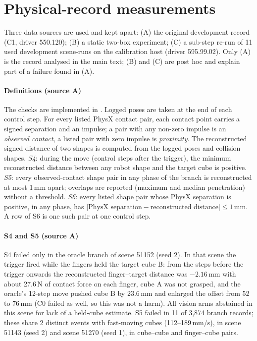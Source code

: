 \section{Physical-record measurements}\label{sec:s-physics}

Three data sources are used and kept apart: (A) the original development record (C1, driver 550.120); (B) a static two-box experiment; (C) a sub-step re-run of 11 used development scene-runs on the calibration host (driver 595.99.02). Only (A) is the record analysed in the main text; (B) and (C) are post hoc and explain part of a failure found in (A).

\paragraph{Definitions (source A)} The checks are implemented in . Logged poses are taken at the end of each control step. For every listed PhysX contact pair, each contact point carries a signed separation and an impulse; a pair with any non-zero impulse is an \emph{observed contact}, a listed pair with zero impulse is \emph{proximity}. The reconstructed signed distance of two shapes is computed from the logged poses and collision shapes. \emph{S4}: during the move (control steps after the trigger), the minimum reconstructed distance between any robot shape and the target cube is positive. \emph{S5}: every observed-contact shape pair in any phase of the branch is reconstructed at most 1\,mm apart; overlaps are reported (maximum and median penetration) without a threshold. \emph{S6}: every listed shape pair whose PhysX separation is positive, in any phase, has $|\text{PhysX separation}-\text{reconstructed distance}|\le1$\,mm. A row of S6 is one such pair at one control step.

\paragraph{S4 and S5 (source A)} S4 failed only in the oracle branch of scene 51152 (seed 2). In that scene the trigger fired while the fingers held the target cube B: from the steps before the trigger onwards the reconstructed finger--target distance was $-2.16$\,mm with about 27.6\,N of contact force on each finger, cube A was not grasped, and the oracle's 12-step move pushed cube B by 23.6\,mm and enlarged the offset from 52 to 76\,mm (C0 failed as well, so this was not a harm). All vision arms abstained in this scene for lack of a held-cube estimate. S5 failed in 11 of 3,874 branch records; these share 2 distinct events with fast-moving cubes (112--189\,mm/s), in scene 51143 (seed 2) and scene 51270 (seed 1), in cube--cube and finger--cube pairs.

